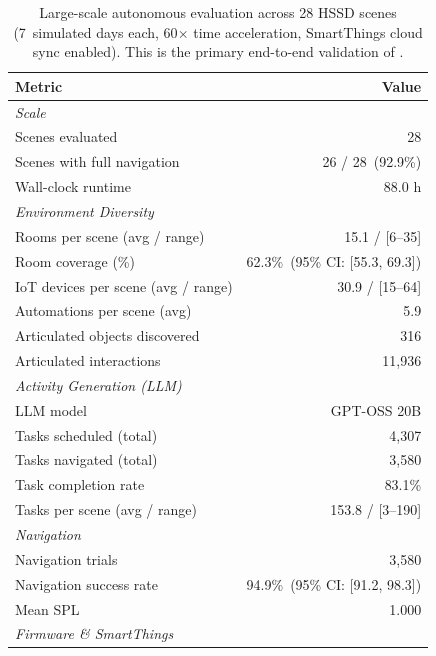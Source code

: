 \begin{table}[t]
  \centering
  \caption{Large-scale autonomous evaluation across 28 HSSD scenes
  (7~simulated days each, 60$\times$ time acceleration, SmartThings
  cloud sync enabled).  This is the primary end-to-end validation of
  \sys{}.}
  \label{tab:autonomous-eval}
  \small
  \begin{tabular}{l r}
    \toprule
    {Metric} & {Value} \\
    \midrule
    \multicolumn{2}{l}{\textit{Scale}} \\
    \quad Scenes evaluated          & 28 \\
    \quad Scenes with full navigation & 26 / 28~(92.9\%) \\
    \quad Wall-clock runtime        & 88.0 h \\
    \midrule
    \multicolumn{2}{l}{\textit{Environment Diversity}} \\
    \quad Rooms per scene (avg / range)   & 15.1 / [6--35] \\
    \quad Room coverage (\%)              & 62.3\%~(95\% CI: [55.3, 69.3]) \\
    \quad IoT devices per scene (avg / range) & 30.9 / [15--64] \\
    \quad Automations per scene (avg)     & 5.9 \\
    \quad Articulated objects discovered  & 316 \\
    \quad Articulated interactions        & 11{,}936 \\
    \midrule
    \multicolumn{2}{l}{\textit{Activity Generation (LLM)}} \\
    \quad LLM model                       & GPT-OSS 20B \\
    \quad Tasks scheduled (total)         & 4{,}307 \\
    \quad Tasks navigated (total)         & 3{,}580 \\
    \quad Task completion rate            & 83.1\% \\
    \quad Tasks per scene (avg / range)   & 153.8 / [3--190] \\
    \midrule
    \multicolumn{2}{l}{\textit{Navigation}} \\
    \quad Navigation trials               & 3{,}580 \\
    \quad Navigation success rate         & 94.9\%~(95\% CI: [91.2, 98.3]) \\
    \quad Mean SPL                        & 1.000 \\
    \midrule
    \multicolumn{2}{l}{\textit{Firmware \& SmartThings}} \\

\end{tabular}
\end{table}
